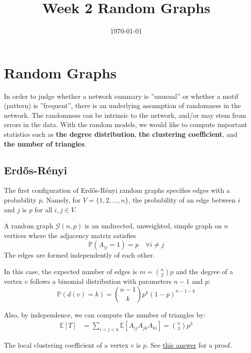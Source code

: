 \documentclass{article}
\title{Week 2 Random Graphs}
\date{\today}
\begin{document}
\maketitle

\section{Random Graphs}
In order to judge whether a network summary is ”unusual” or whether a motif (pattern) is ”frequent”, there is an underlying assumption of randomness in the network. The randomness can be intrinsic to the network, and/or may stem from errors in the data. With the random models, we would like to compute important statistics such as \textbf{the degree distribution}, \textbf{the clustering coefficient}, and \textbf{the number of triangles}.

\subsection{Erd\H{o}s-R\'{e}nyi}
The first configuration of Erd\H{o}s-R\'{e}nyi random graphs specifies edges with a probability $p$. Namely, for $V=\{1,2,\ldots,n\}$, the probability of an edge between $i$ and $j$ is $p$ for all $i,j\in V$.
\begin{definition}
    A random graph $\mathcal{G}(n,p)$ is an undirected, unweighted, simple graph on $n$ vertices where the adjacency matrix satisfies
    \begin{equation*}
        \mathbb{P}(A_{ij}=1)=p \quad \forall i \neq j
    \end{equation*}
    The edges are formed independently of each other.
\end{definition}

In this case, the expected number of edges is $m=\binom{n}{2}p$ and the degree of a vertex $v$ follows a binomial distribution with parameters $n-1$ and $p$:
\[
\mathbb{P}(d(v)=k)=\binom{n-1}{k}p^k(1-p)^{n-1-k}
\]

Also, by independence, we can compute the number of triangles by:
\begin{align*}
    \mathbb{E}[T]&=\sum_{i<j<k} \mathbb{E}[A_{ij}A_{jk}A_{ki}]=\binom{n}{3}p^3
\end{align*}

\begin{unexaminable}
    The local clustering coefficient of a vertex $v$ is $p$. See \href{https://math.stackexchange.com/questions/2200452/expected-local-clustering-coefficient-for-a-node-in-a-network}{this answer} for a proof.
\end{unexaminable}
\end{document}

